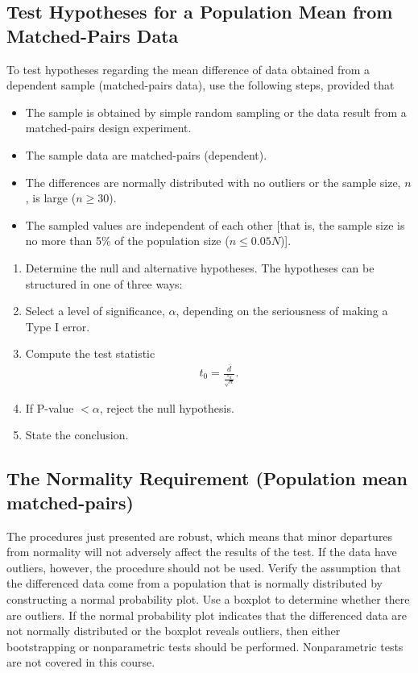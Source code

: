\documentclass{report}
\begin{document}
    \subsection*{Test Hypotheses for a Population Mean from Matched-Pairs Data}
      \bigbreak \noindent 
    To test hypotheses regarding the mean difference of data obtained from a dependent sample (matched-pairs data), use the following steps, provided that
    \begin{itemize}
        \item The sample is obtained by simple random sampling or the data result from a matched-pairs design experiment.
        \item The sample data are matched-pairs (dependent).
        \item The differences are normally distributed with no outliers or the sample size, $n$, is large ($n \geq 30$).
        \item The sampled values are independent of each other [that is, the sample size is no more than 5\% of the population size ($n \leq 0.05N$)].
    \end{itemize}
    \begin{enumerate}
        \item Determine the null and alternative hypotheses. The hypotheses can be structured in one of three ways:
        \item Select a level of significance, $\alpha $, depending on the seriousness of making a Type I error.
        \item Compute the test statistic
            \begin{align*}
                t_{0} =\frac{\bar{d}}{\frac{s_{d}}{\sqrt{n}}}
            .\end{align*}
        \item If P-value $<\alpha $, reject the null hypothesis.
        \item State the conclusion.
    \end{enumerate}

    \pagebreak 
    \subsection*{The Normality Requirement (Population mean matched-pairs)}
    \bigbreak \noindent 
        The procedures just presented are robust, which means that minor departures from normality will not adversely affect the results of the test. If the data have outliers, however, the procedure should not be used.
    \bigbreak \noindent 
    Verify the assumption that the differenced data come from a population that is normally distributed by constructing a normal probability plot. Use a boxplot to determine whether there are outliers. If the normal probability plot indicates that the differenced data are not normally distributed or the boxplot reveals outliers, then either bootstrapping or nonparametric tests should be performed. Nonparametric tests are not covered in this course.
\end{document}
